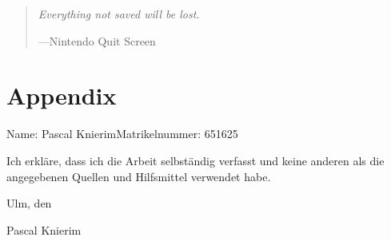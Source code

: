 \documentclass[
    a4paper,
    10pt,
    bibliography=totoc,
    twoside,
    openright,
    numbers=noenddot,
    headings=normal,
    DIV=9,
    BCOR=7mm
    ,parskip
]{scrbook}
\newcommand{\fullname}{Pascal Knierim}
\newcommand{\matnr}{651625}
\begin{document}
\renewcommand{\arraystretch}{1.2} 




\clearpage
\vspace*{\fill}
\thispagestyle{empty} %
\begin{quotation}
\begin{center}

\em %
Everything not saved will be lost.

\medskip
---Nintendo Quit Screen
\end{center}
\end{quotation}
\vspace*{\fill}

\makeatletter
\renewcommand{\@pnumwidth}{1.8em} 
\renewcommand{\@tocrmarg}{2em}
\makeatother

\tableofcontents
{}

\mainmatter
\acresetall













\nocite{Preece:1994wi}

\printbibliography 

\appendix
\chapter{Appendix}

\newpage



\backmatter

\cleardoublepage
\thispagestyle{empty}

Name: \fullname \hfill Matrikelnummer: \matnr \vspace{2cm}


Ich erkläre, dass ich die Arbeit selbständig verfasst und keine anderen als die angegebenen Quellen und Hilfsmittel verwendet habe.\vspace{2cm}

Ulm, den \dotfill

\hfill {\footnotesize \fullname}
\end{document}
